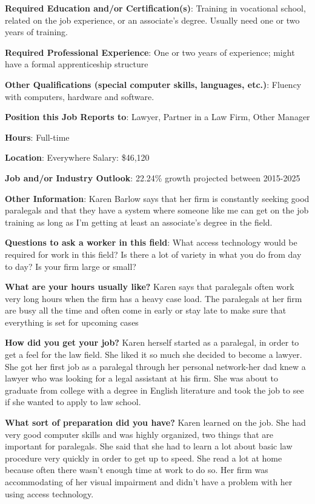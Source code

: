 \textbf{Required Education and/or Certification(s)}: Training in vocational school, related on the job experience, or an associate's degree. Usually need one or two years of training.

\textbf{Required Professional Experience}: One or two years of experience; might have a formal apprenticeship structure

\textbf{Other Qualifications (special computer skills, languages, etc.)}: Fluency with computers, hardware and software.

\textbf{Position this Job Reports to}: Lawyer, Partner in a Law Firm, Other Manager 

\textbf{Hours}: Full-time

\textbf{Location}: Everywhere Salary: \$46,120

\textbf{Job and/or Industry Outlook}: 22.24\% growth projected between 2015-2025

\textbf{Other Information}: Karen Barlow says that her firm is constantly seeking good paralegals and that they have a system where someone like me can get on the job training as long as I'm getting at least an associate's degree in the field.

\textbf{Questions to ask a worker in this field}: 
\break What access technology would be required for work in this field? 
\break Is there a lot of variety in what you do from day to day? 
\break Is your firm large or small?

\textbf{What are your hours usually like? }
\break Karen says that paralegals often work very long hours when the firm has a heavy case load. The paralegals at her firm are busy all the time and often come in early or stay late to make sure that everything is set for upcoming cases

\textbf{How did you get your job?}
\break Karen herself started as a paralegal, in order to get a feel for the law field. She liked it so much she decided to become a lawyer. She got her first job as a paralegal through her personal network-her dad knew a lawyer who was looking for a legal assistant at his firm. She was about to graduate from college with a degree in English literature and took the job to see if she wanted to apply to law school.

\textbf{What sort of preparation did you have?} 
\break Karen learned on the job. She had very good computer skills and was highly organized, two things that are important for paralegals. She said that she had to learn a lot about basic law procedure very quickly in order to get up to speed. She read a lot at home because often there wasn't enough time at work to do so. Her firm was accommodating of her visual impairment and didn't have a problem with her using access technology.
 
